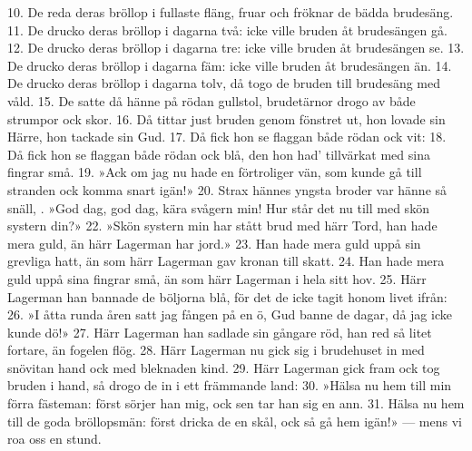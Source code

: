 \begin{adjustwidth*}{-4.5mm}{-4.5mm}
\setlength{\columnsep}{0.6cm}
\begin{multicols}{2}
10. De reda deras bröllop i fullaste fläng,
    fruar och fröknar de bädda brudesäng.
11. De drucko deras bröllop i dagarna två:
    icke ville bruden åt brudesängen gå.
12. De drucko deras bröllop i dagarna tre:
    icke ville bruden åt brudesängen se.
13. De drucko deras bröllop i dagarna fäm:
    icke ville bruden åt brudesängen än.
14. De drucko deras bröllop i dagarna tolv,
    då togo de bruden till brudesäng med våld.
15. De satte då hänne på rödan gullstol,
    brudetärnor drogo av både strumpor ock skor.
16. Då tittar just bruden genom fönstret ut,
    hon lovade sin Härre, hon tackade sin Gud.
17. Då fick hon se flaggan både rödan ock vit:
18. Då fick hon se flaggan både rödan ock blå,
    den hon had’ tillvärkat med sina fingrar små.
19. »Ack om jag nu hade en förtroliger vän,
    som kunde gå till stranden ock komma snart igän!»
20. Strax hännes yngsta broder var hänne så snäll,
\vfill{}. »God dag, god dag, kära svågern min!
    Hur står det nu till med skön systern din?»
22. »Skön systern min har stått brud med härr Tord,
    han hade mera guld, än härr Lagerman har jord.» %
23. Han hade mera guld uppå sin grevliga hatt,
    än som härr Lagerman gav kronan till skatt.
24. Han hade mera guld uppå sina fingrar små,
    än som härr Lagerman i hela sitt hov.
25. Härr Lagerman han bannade de böljorna blå,
    för det de icke tagit honom livet ifrån:
26. »I åtta runda åren satt jag fången på en ö,
    Gud banne de dagar, då jag icke kunde dö!»
27. Härr Lagerman han sadlade sin gångare röd,
    han red så litet fortare, än fogelen flög.
28. Härr Lagerman nu gick sig i brudehuset in
    med snövitan hand ock med bleknaden kind.
29. Härr Lagerman gick fram ock tog bruden i hand,
    så drogo de in i ett främmande land:
30. »Hälsa nu hem till min förra fästeman:
    först sörjer han mig, ock sen tar han sig en ann.
31. Hälsa nu hem till de goda bröllopsmän:
    först dricka de en skål, ock så gå hem igän!» —
    \qquad{}mens vi roa oss en stund.
\end{multicols}
\end{adjustwidth*}
